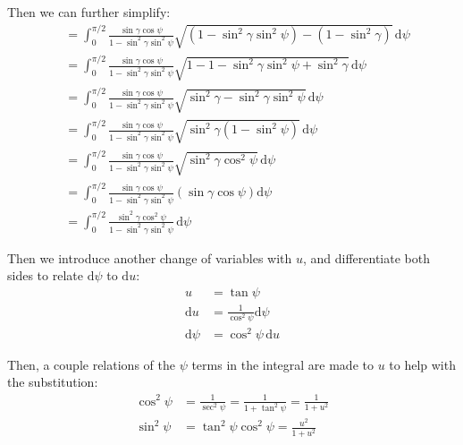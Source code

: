 \documentclass[titlepage]{article}
\begin{document}
Then we can further simplify:
\begin{equation}
	\begin{split}
		&=\int_{0}^{\pi/2}\frac{\sin\gamma\cos\psi}{1-\sin^2\gamma\sin^2\psi}\sqrt{\left(1-\sin^2\gamma\sin^2\psi\right)-\left(1-\sin^2\gamma\right)}\,\mathrm{d}\psi \\
		&=\int_{0}^{\pi/2}\frac{\sin\gamma\cos\psi}{1-\sin^2\gamma\sin^2\psi}\sqrt{1-1-\sin^2\gamma\sin^2\psi+\sin^2\gamma}\,\mathrm{d}\psi \\
		&=\int_{0}^{\pi/2}\frac{\sin\gamma\cos\psi}{1-\sin^2\gamma\sin^2\psi}\sqrt{\sin^2\gamma-\sin^2\gamma\sin^2\psi}\,\mathrm{d}\psi \\
		&=\int_{0}^{\pi/2}\frac{\sin\gamma\cos\psi}{1-\sin^2\gamma\sin^2\psi}\sqrt{\sin^2\gamma\left(1-\sin^2\psi\right)}\,\mathrm{d}\psi \\
		&=\int_{0}^{\pi/2}\frac{\sin\gamma\cos\psi}{1-\sin^2\gamma\sin^2\psi}\sqrt{\sin^2\gamma\cos^2\psi}\,\mathrm{d}\psi \\
		&=\int_{0}^{\pi/2}\frac{\sin\gamma\cos\psi}{1-\sin^2\gamma\sin^2\psi}\left(\sin\gamma\cos\psi\right)\mathrm{d}\psi \\
		&=\int_{0}^{\pi/2}\frac{\sin^2\gamma\cos^2\psi}{1-\sin^2\gamma\sin^2\psi}\,\mathrm{d}\psi
	\end{split}
\end{equation}

Then we introduce another change of variables with $u$, and differentiate both sides to relate $\mathrm{d}\psi$ to $\mathrm{d}u$:
\begin{equation}
	\begin{split}
		u&=\tan\psi \\
		\mathrm{d}u&=\frac{1}{\cos^2\psi}\mathrm{d}\psi \\
		\mathrm{d}\psi&=\cos^2\psi\,\mathrm{d}u
	\end{split}
\end{equation}

Then, a couple relations of the $\psi$ terms in the integral are made to $u$ to help with the substitution:
\begin{equation}
	\begin{split}
		\cos^2\psi&=\frac{1}{\sec^2\psi}=\frac{1}{1+\tan^2\psi}=\frac{1}{1+u^2} \\
		\sin^2\psi&=\tan^2\psi\cos^2\psi=\frac{u^2}{1+u^2}
	\end{split}
\end{equation}
\end{document}
